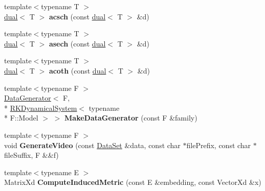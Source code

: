 \begin{DoxyCompactItemize}
\item 
\hypertarget{namespace_d_r_d_s_p_a0e78e0aa5f7f95be037ac0867241f42b}{{\footnotesize template$<$typename T $>$ }\\\hyperlink{struct_d_r_d_s_p_1_1dual}{dual}$<$ T $>$ {\bfseries acsch} (const \hyperlink{struct_d_r_d_s_p_1_1dual}{dual}$<$ T $>$ \&d)}\label{namespace_d_r_d_s_p_a0e78e0aa5f7f95be037ac0867241f42b}

\item 
\hypertarget{namespace_d_r_d_s_p_ab0e1c734f9d9cb083a6eed712b673692}{{\footnotesize template$<$typename T $>$ }\\\hyperlink{struct_d_r_d_s_p_1_1dual}{dual}$<$ T $>$ {\bfseries asech} (const \hyperlink{struct_d_r_d_s_p_1_1dual}{dual}$<$ T $>$ \&d)}\label{namespace_d_r_d_s_p_ab0e1c734f9d9cb083a6eed712b673692}

\item 
\hypertarget{namespace_d_r_d_s_p_a8ea942ba72f5e5db0d5dd14563d5cf3e}{{\footnotesize template$<$typename T $>$ }\\\hyperlink{struct_d_r_d_s_p_1_1dual}{dual}$<$ T $>$ {\bfseries acoth} (const \hyperlink{struct_d_r_d_s_p_1_1dual}{dual}$<$ T $>$ \&d)}\label{namespace_d_r_d_s_p_a8ea942ba72f5e5db0d5dd14563d5cf3e}

\item 
\hypertarget{namespace_d_r_d_s_p_af3ee0bfe0ba3d52879952a631b8189c6}{{\footnotesize template$<$typename F $>$ }\\\hyperlink{struct_d_r_d_s_p_1_1_data_generator}{Data\-Generator}$<$ F, \\*
\hyperlink{struct_d_r_d_s_p_1_1_r_k_dynamical_system}{R\-K\-Dynamical\-System}$<$ typename \\*
F\-::\-Model $>$ $>$ {\bfseries Make\-Data\-Generator} (const F \&family)}\label{namespace_d_r_d_s_p_af3ee0bfe0ba3d52879952a631b8189c6}

\item 
\hypertarget{namespace_d_r_d_s_p_af4d1d38989b2ec23162bc8f91224b9dc}{{\footnotesize template$<$typename F $>$ }\\void {\bfseries Generate\-Video} (const \hyperlink{struct_d_r_d_s_p_1_1_data_set}{Data\-Set} \&data, const char $\ast$file\-Prefix, const char $\ast$file\-Suffix, F \&\&f)}\label{namespace_d_r_d_s_p_af4d1d38989b2ec23162bc8f91224b9dc}

\item 
\hypertarget{namespace_d_r_d_s_p_ac9f2df4bb7e0ab3ef94dca7616cdbc3a}{{\footnotesize template$<$typename E $>$ }\\Matrix\-Xd {\bfseries Compute\-Induced\-Metric} (const E \&embedding, const Vector\-Xd \&x)}\label{namespace_d_r_d_s_p_ac9f2df4bb7e0ab3ef94dca7616cdbc3a}


\end{DoxyCompactItemize}
